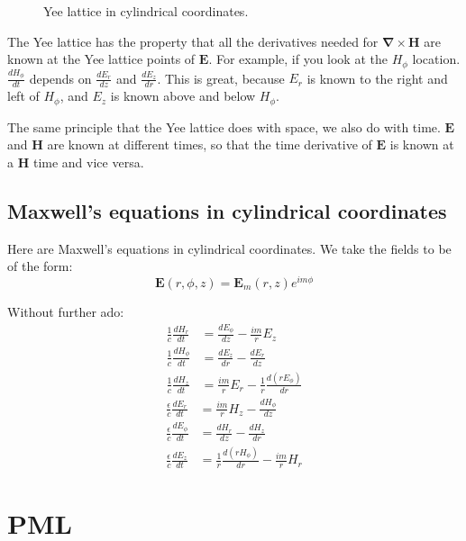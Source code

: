 \documentclass[floats]{book}
\begin{document}
\begin{figure}
\caption{Yee lattice in cylindrical coordinates.
\label{yee_fig}}
\centering
\mbox{}
\end{figure}

The Yee lattice has the property that all the derivatives needed for
$\mathbf \nabla \times \mathbf H$ are known at the Yee lattice points of
$\mathbf E$.  For example, if you look at the $H_\phi$ location.
$\frac{dH_\phi}{dt}$ depends on $\frac{dE_r}{dz}$ and $\frac{dE_z}{dr}$.
This is great, because $E_r$ is known to the right and left of $H_\phi$,
and $E_z$ is known above and below $H_\phi$.

The same principle that the Yee lattice does with space, we also do with
time.  $\mathbf E$ and $\mathbf H$ are known at different times, so that
the time derivative of $\mathbf E$ is known at a $\mathbf H$ time and vice
versa.

\section{Maxwell's equations in cylindrical coordinates}

Here are Maxwell's equations in cylindrical coordinates.  We take the
fields to be of the form:
\begin{equation*}
\mathbf{E}(r,\phi,z) = \mathbf{E}_m(r,z)e^{i m \phi} 
\end{equation*}

Without further ado:
\begin{align}
\frac1c\frac{dH_r}{dt} &= \frac{dE_\phi}{dz} - \frac{im}r E_z\\
\frac1c\frac{dH_\phi}{dt} &= \frac{dE_z}{dr} - \frac{dE_r}{dz}\\
\frac1c\frac{dH_z}{dt} &= \frac{im}r E_r - \frac1r\frac{d(rE_\phi)}{dr}
\end{align}
\begin{align}
\frac\epsilon c\frac{dE_r}{dt} &= \frac{im}r H_z - \frac{dH_\phi}{dz} \\
\frac\epsilon c\frac{dE_\phi}{dt} &= \frac{dH_r}{dz} - \frac{dH_z}{dr} \\
\frac\epsilon c\frac{dE_z}{dt} &= \frac1r\frac{d(rH_\phi)}{dr} - \frac{im}r H_r
\end{align}


\chapter{PML}
\end{document}
